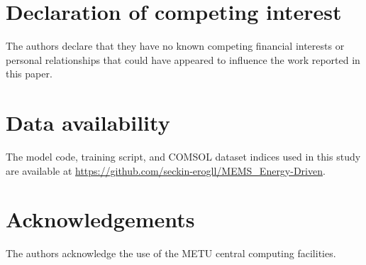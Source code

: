 \documentclass[review,12pt]{elsarticle}
\begin{document}
\section*{Declaration of competing interest}

The authors declare that they have no known competing financial interests or
personal relationships that could have appeared to influence the work reported
in this paper.

\section*{Data availability}

The model code, training script, and COMSOL dataset indices used in this study
are available at \url{https://github.com/seckin-erogll/MEMS_Energy-Driven}.

\section*{Acknowledgements}

The authors acknowledge the use of the METU central computing facilities.



\end{document}
